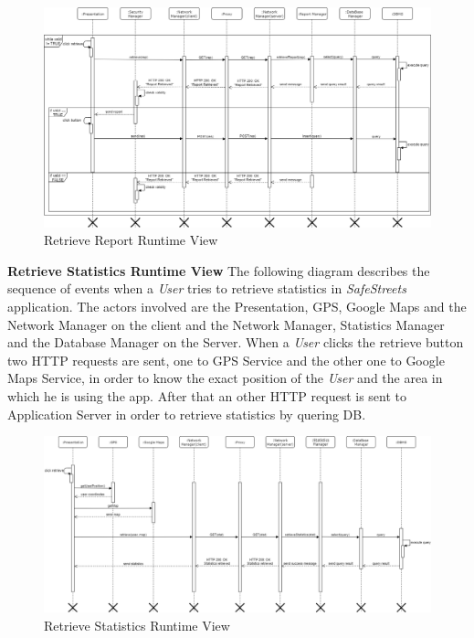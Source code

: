 \documentclass{article}
\begin{document}
\begin{figure}[H]
    \centering
    \includegraphics[scale=0.4]{img/sequence_diagrams/retrieve_report.png}
    \caption{Retrieve Report Runtime View}
\end{figure}  


\textbf{Retrieve Statistics Runtime View}
The following diagram describes the sequence of events when a \textit{User} tries to retrieve statistics in
\textit{SafeStreets} application. The actors involved are the Presentation, GPS, Google Maps and the Network 
Manager on the client and the Network Manager, Statistics Manager and the Database Manager on the Server.
When a \textit{User} clicks the retrieve button two HTTP requests are sent, one to GPS Service and the other
one to Google Maps Service, in order to know the exact position of the \textit{User} and the area in which he is
using the app. After that an other HTTP request is sent to Application Server in order to retrieve statistics by 
quering DB. 

\begin{figure}[H]
    \centering
    \includegraphics[scale=0.4]{img/sequence_diagrams/retrieve_statistics.png}
    \caption{Retrieve Statistics Runtime View}
\end{figure}  
\end{document}
